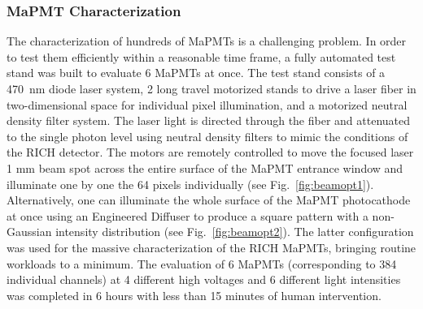\documentclass[5p,times,twocolumn]{elsarticle}
\begin{document}
\subsubsection{MaPMT Characterization}
\label{sec:FEtests}

The characterization of hundreds of MaPMTs is a  challenging problem. In order to test them efficiently within a
reasonable time frame, a fully automated test stand was built to evaluate 6 MaPMTs at once. The test stand consists
of a 470~nm diode laser system, 2 long travel motorized stands to drive a laser fiber in two-dimensional space for
individual pixel illumination, and a motorized neutral density filter system. The laser light is directed through the
fiber and attenuated to the single photon level using neutral density filters to mimic the conditions of the RICH
detector. The motors are remotely controlled to move the focused laser 1 mm beam spot across the entire surface of the MaPMT
entrance window and illuminate one by one the 64 pixels individually (see Fig.~\ref{fig:beamopt1}). Alternatively, one
can illuminate the whole surface of the MaPMT photocathode at once using an Engineered Diffuser to produce a square
pattern with a non-Gaussian intensity distribution (see Fig.~\ref{fig:beamopt2}). The latter configuration was used for the
massive characterization of the RICH MaPMTs, bringing routine workloads to a minimum. The evaluation of 6 MaPMTs
(corresponding to 384 individual channels) at 4 different high voltages and 6 different light intensities was completed
in 6 hours with less than 15 minutes of human intervention.
\end{document}
